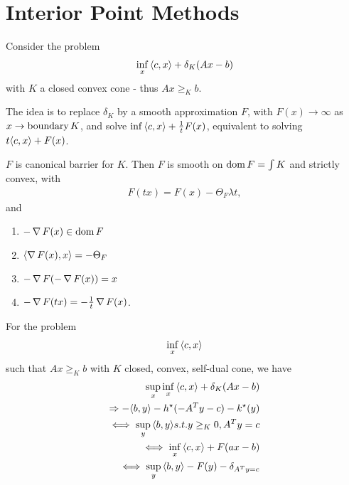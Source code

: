 \chapter{Interior Point Methods}
\label{cha:inter-point-meth}

\begin{thm}[Problem]
  \label{defn:interior_point_methods:1}
  Consider the problem
  \begin{align}
    \label{eq:76}
    \inf_{x} \IP{c, x}  + \delta_{K}(Ax - b)
  \end{align} with $K$ a closed convex cone - thus $Ax \geq_{K} b$.
\end{thm}

\begin{notation}
\end{notation}

The idea is to replace $\delta_{K}$ by a smooth approximation $F$,
with $F(x) \rightarrow \infty$ as $x \rightarrow \operatorname*{boundary} K$, and
solve $\inf \IP{c, x} + \frac{1}{t} F(x)$, equivalent to solving $t
\IP{c, x} + F(x)$.

\begin{proposition}
  $F$ is canonical barrier for $K$.  Then $F$ is smooth on $\operatorname*{dom} F =
  \int K$ and strictly convex, with
  \begin{align}
    \label{eq:77}
    F(tx) = F(x) - \Theta_{F} \lambda t,
  \end{align} and
  \begin{enumerate}
  \item $- \operatorname*{\nabla} F(x) \in \operatorname*{dom} F$
  \item $\IP{\grad F(x), x} = - \Theta_{F}$
  \item $- \operatorname*{\nabla} F(- \operatorname*{\nabla} F(x)) = x$
  \item $- \operatorname*{\nabla} F(tx) = - \frac{1}{t} \operatorname*{\nabla} F(x)$.
  \end{enumerate}
\end{proposition}

For the problem
\begin{align}
  \label{eq:78}
  \inf_{x} \IP{c, x} 
\end{align} such that $Ax \geq_{K} b$ with $K$ closed, convex,
self-dual cone, we have
\begin{align}
  \label{eq:79}
  \sup_{x} \inf_{x} \IP{c, x} + \delta_{K} (Ax - b) \\
  \Rightarrow -\IP{b, y} - h^{\star}(-A^{T} y - c) - k^{\star}(y) \\
  \iff \sup_{y} \IP{b, y} s.t. y \geq_{K} 0, A^{T} y = c \\
  \iff \inf_{x} \IP{c, x} + F(ax - b) \\
  \iff \sup_{y} \IP{b, y} - F(y) - \delta_{A^{T}y = c}
\end{align}


